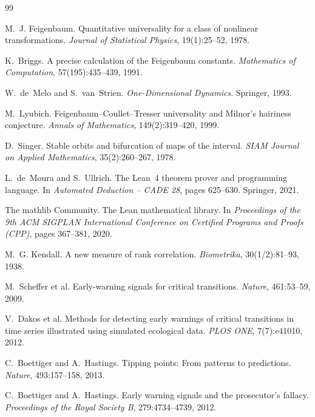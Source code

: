 \documentclass[11pt,a4paper]{article}
\begin{document}
\clearpage
\begin{thebibliography}{99}

M.~J. Feigenbaum.
\newblock Quantitative universality for a class of nonlinear transformations.
\newblock \emph{Journal of Statistical Physics}, 19(1):25--52, 1978.

K.~Briggs.
\newblock A precise calculation of the Feigenbaum constants.
\newblock \emph{Mathematics of Computation}, 57(195):435--439, 1991.

W.~de~Melo and S.~van~Strien.
\newblock \emph{One-Dimensional Dynamics}.
\newblock Springer, 1993.

M.~Lyubich.
\newblock Feigenbaum--Coullet--Tresser universality and Milnor's hairiness conjecture.
\newblock \emph{Annals of Mathematics}, 149(2):319--420, 1999.

D.~Singer.
\newblock Stable orbits and bifurcation of maps of the interval.
\newblock \emph{SIAM Journal on Applied Mathematics}, 35(2):260--267, 1978.

L.~de~Moura and S.~Ullrich.
\newblock The Lean~4 theorem prover and programming language.
\newblock In \emph{Automated Deduction -- CADE 28}, pages 625--630. Springer, 2021.

The mathlib Community.
\newblock The Lean mathematical library.
\newblock In \emph{Proceedings of the 9th ACM SIGPLAN International Conference
  on Certified Programs and Proofs (CPP)}, pages 367--381, 2020.

M.~G. Kendall.
\newblock A new measure of rank correlation.
\newblock \emph{Biometrika}, 30(1/2):81--93, 1938.

M.~Scheffer et al.
\newblock Early-warning signals for critical transitions.
\newblock \emph{Nature}, 461:53--59, 2009.

V.~Dakos et al.
\newblock Methods for detecting early warnings of critical transitions in time
  series illustrated using simulated ecological data.
\newblock \emph{PLOS ONE}, 7(7):e41010, 2012.

C.~Boettiger and A.~Hastings.
\newblock Tipping points: From patterns to predictions.
\newblock \emph{Nature}, 493:157--158, 2013.

C.~Boettiger and A.~Hastings.
\newblock Early warning signals and the prosecutor's fallacy.
\newblock \emph{Proceedings of the Royal Society B}, 279:4734--4739, 2012.


\end{thebibliography}
\end{document}
